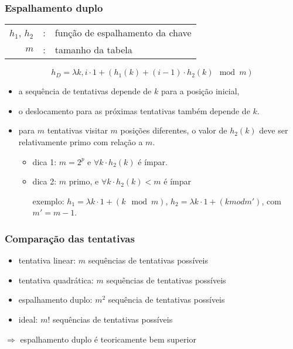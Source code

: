 \documentclass{beamer}
\begin{document}
\begin{frame}

\frametitle{Espalhamento duplo}

\begin{tabular}{rcl}
$h_1$, $h_2$ & : & função de espalhamento da chave \\
$m$ & : & tamanho da tabela
\end{tabular}

$$h_D = \lambda k, i \cdot 1 + (h_1(k) + (i-1)\cdot h_2(k) \mod m)$$

\begin{itemize}
\item a sequência de tentativas depende de $k$ para a posição inicial, 

\item o deslocamento para as próximas tentativas também depende de $k$.

\item para $m$ tentativas visitar $m$ posições diferentes,
  o valor de $h_2(k)$ deve ser relativamente primo com relação a $m$.

\begin{itemize}

\item dica 1: $m = 2^p$ e $\forall k \cdot h_2(k)$ é ímpar.

\item dica 2: $m$ primo, e $\forall k \cdot h_2(k) < m$ é ímpar

  exemplo: $h_1 = \lambda k \cdot 1 + (k \mod m)$, $h_2 = \lambda k \cdot 1 + (k mod m')$,
  com $m' = m - 1$.

\end{itemize}

\end{itemize}

\end{frame}

\begin{frame}

\frametitle{Comparação das tentativas}

\begin{itemize}

\item tentativa linear: $m$ sequências de tentativas possíveis

\item tentativa quadrática: $m$ sequências de tentativas possíveis

\item espalhamento duplo: $m^2$ sequência de tentativas possíveis

\item ideal: $m!$ sequências de tentativas possíveis

\end{itemize}

\alert{$\Longrightarrow$} espalhamento duplo é teoricamente bem superior

\end{frame}
\end{document}
